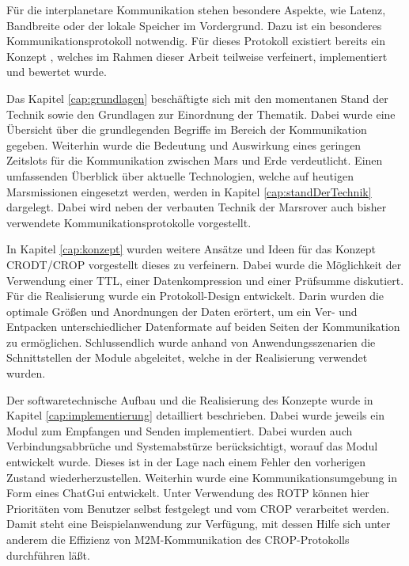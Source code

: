 
Für die interplanetare Kommunikation stehen besondere Aspekte, wie Latenz,
Bandbreite oder der lokale Speicher im Vordergrund. Dazu ist ein besonderes
Kommunikationsprotokoll notwendig. Für dieses Protokoll existiert
bereits ein Konzept \cite{Daher}, welches im Rahmen dieser Arbeit
teilweise verfeinert, implementiert und bewertet wurde.

Das Kapitel \ref{cap:grundlagen} beschäftigte sich
mit den momentanen Stand der Technik sowie den Grundlagen zur Einordnung der
Thematik. Dabei wurde eine Übersicht über die grundlegenden Begriffe im
Bereich der Kommunikation gegeben. Weiterhin wurde die Bedeutung und
Auswirkung eines geringen Zeitslots für die Kommunikation zwischen Mars und Erde
verdeutlicht.\newline
Einen umfassenden Überblick über aktuelle Technologien, welche auf heutigen
Marsmissionen eingesetzt werden, werden in Kapitel \ref{cap:standDerTechnik}
dargelegt.
Dabei wird neben der verbauten Technik der Marsrover auch bisher verwendete
Kommunikationsprotokolle vorgestellt.

In Kapitel \ref{cap:konzept} wurden weitere Ansätze und Ideen für das Konzept
\gls{CRODT}/\gls{CROP} vorgestellt dieses zu verfeinern. Dabei wurde die
Möglichkeit der Verwendung einer \gls{TTL}, einer Datenkompression und einer
Prüfsumme diskutiert. Für die Realisierung wurde ein Protokoll-Design
entwickelt. Darin wurden die optimale Größen und Anordnungen der Daten erörtert,
um ein Ver- und Entpacken unterschiedlicher Datenformate auf beiden Seiten der
Kommunikation zu ermöglichen.
Schlussendlich wurde anhand von Anwendungsszenarien die Schnittstellen der
Module abgeleitet, welche in der Realisierung verwendet wurden.

Der softwaretechnische Aufbau und die Realisierung des Konzepte
wurde in Kapitel \ref{cap:implementierung} detailliert beschrieben. Dabei wurde
jeweils ein Modul zum Empfangen und Senden implementiert.
Dabei wurden auch Verbindungsabbrüche und Systemabstürze berücksichtigt, worauf
das Modul  entwickelt wurde. Dieses ist in der Lage nach
einem Fehler den vorherigen Zustand wiederherzustellen.
Weiterhin wurde eine Kommunikationsumgebung in Form eines ChatGui entwickelt.
Unter Verwendung des \gls{ROTP} können hier Prioritäten vom Benutzer selbst
festgelegt und vom CROP verarbeitet werden. Damit steht eine Beispielanwendung
zur Verfügung, mit dessen Hilfe sich unter anderem die Effizienz von
M$2$M-Kommunikation des \gls{CROP}-Protokolls durchführen läßt.

